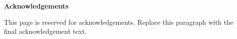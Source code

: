\cleardoublepage
{}
{}
\vspace*{1\baselineskip}
{\centering\sffamily\bfseries\fontsize{18pt}{22.5pt}\selectfont Acknowledgements\par}
\vspace{0.8\baselineskip}

This page is reserved for acknowledgements. Replace this paragraph with the final acknowledgement text.
